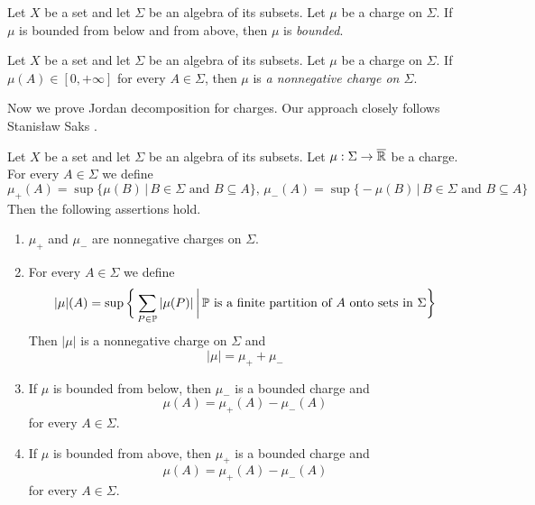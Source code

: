 \begin{definition}
    Let $X$ be a set and let $\Sigma$ be an algebra of its subsets. Let $\mu$ be a charge on $\Sigma$. If $\mu$ is bounded from below and from above, then $\mu$ is \textit{bounded}.
\end{definition}

\begin{definition}
    Let $X$ be a set and let $\Sigma$ be an algebra of its subsets. Let $\mu$ be a charge on $\Sigma$. If $\mu(A) \in [0,+\infty]$ for every $A \in \Sigma$, then $\mu$ is \textit{a nonnegative charge on $\Sigma$}.
\end{definition}
\noindent
Now we prove Jordan decomposition for charges. Our approach closely follows Stanis{\l}aw Saks \cite{saks1937theory}.

\begin{theorem}\label{theorem:Jordan_decomposition}
    Let $X$ be a set and let $\Sigma$ be an algebra of its subsets. Let $\mu:\Sigma \rightarrow \overline{{\mathbb R}}$ be a charge. For every $A \in \Sigma$ we define
    $$\mu_+(A) = \sup\big\{\mu(B)\,\big|\,B\in \Sigma\mbox{ and }B\subseteq A\big\},\,\mu_-(A) = \sup\big\{-\mu(B)\,\big|\,B\in \Sigma\mbox{ and }B\subseteq A\big\}$$
    Then the following assertions hold.
    \begin{enumerate}[label=\emph{\textbf{(\arabic*)}}, leftmargin=*]
        \item $\mu_+$ and $\mu_-$ are nonnegative charges on $\Sigma$.
        \item For every $A \in \Sigma$ we define
              $$|\mu|(A) = \sup \bigg\{\sum_{P\in {\mathbb P}}|\mu(P)|\,\bigg|\,{\mathbb P}\mbox{ is a finite partition of }A\mbox{ onto sets in }\Sigma\bigg\}$$
              Then $|\mu|$ is a nonnegative charge on $\Sigma$ and
              $$|\mu| = \mu_+ + \mu_-$$
        \item If $\mu$ is bounded from below, then $\mu_-$ is a bounded charge and
              $$\mu(A) = \mu_+(A) - \mu_-(A)$$
              for every $A \in \Sigma$.
        \item If $\mu$ is bounded from above, then $\mu_+$ is a bounded charge and
              $$\mu(A) = \mu_+(A) - \mu_-(A)$$
              for every $A \in \Sigma$.
    \end{enumerate}
\end{theorem}
